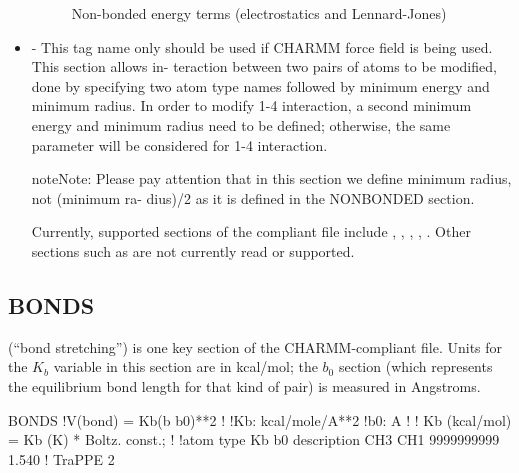 \documentclass[letterpaper,10pt,english]{sphinxmanual}
\begin{document}
\begin{itemize}
\begin{figure}[htbp]
\centering
\capstart

\noindent{}
\caption{Non-bonded energy terms (electrostatics and Lennard-Jones)}\label{\detokenize{input_file:id4}}\end{figure}

\item {} 
- This tag name only should be used if CHARMM force field is being used. This section allows in- teraction between two pairs of atoms to be modified, done by specifying two atom type names followed by minimum energy and minimum radius. In order to modify 1-4 interaction, a second minimum energy and minimum radius need to be defined; otherwise, the same parameter will be considered for 1-4 interaction.

\begin{sphinxadmonition}{note}{Note:}
Please pay attention that in this section we define minimum radius, not (minimum ra- dius)/2 as it is defined in the NONBONDED section.
\end{sphinxadmonition}

Currently, supported sections of the  compliant file include , , , , . Other sections such as  are not currently read or supported.

\end{itemize}


\subsection{BONDS}
\label{\detokenize{input_file:bonds}}
(“bond stretching”) is one key section of the CHARMM-compliant file. Units for the \(K_b\) variable in this section are in kcal/mol; the \(b_0\) section (which represents the equilibrium bond length for that kind of pair) is measured in Angstroms.

%
\begin{sphinxVerbatim}[commandchars=\\\{\}]
BONDS
!V(bond) = Kb(b \PYGZhy{} b0)**2
!
!Kb:  kcal/mole/A**2
!b0:  A
!
!  Kb (kcal/mol) = Kb (K) * Boltz.  const.;
!
!atom type Kb b0 description
CH3 CH1 9999999999 1.540 !  TraPPE 2
\end{sphinxVerbatim}
\end{document}
